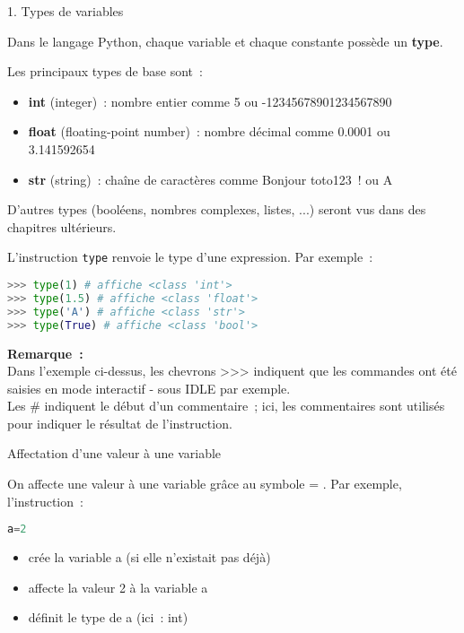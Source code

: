 
\begin{h2}1. Types de variables\end{h2}
Dans le langage Python, chaque variable et chaque constante possède un \textbf{type}.
\par
Les principaux types de base sont~:
\begin{itemize}
     \item %
     \textbf{int} (integer)~: nombre entier comme 5 ou -12345678901234567890
     \item %
     \textbf{float} (floating-point number)~: nombre décimal comme 0.0001 ou 3.141592654
     \item %
     \textbf{str} (string)~: chaîne de caractères comme \og Bonjour toto123~! \fg{} ou \og A \fg{}
\end{itemize}
\par
D'autres types (booléens, nombres complexes, listes, ...) seront vus dans des chapitres ultérieurs.
\par
L'instruction \og \texttt{type} \fg{} renvoie le type d'une expression. Par exemple~:
\begin{lstlisting}[language=Python]
>>> type(1) # affiche <class 'int'>
>>> type(1.5) # affiche <class 'float'>
>>> type('A') # affiche <class 'str'>
>>> type(True) # affiche <class 'bool'>
\end{lstlisting}
\textbf{Remarque~:}\\
Dans l'exemple ci-dessus, les chevrons >>> indiquent que les commandes ont été saisies en mode interactif - sous IDLE par exemple.\\
Les \# indiquent le début d'un commentaire~; ici, les commentaires sont utilisés pour indiquer le résultat de l'instruction.
\begin{h3}Affectation d'une valeur à une variable\end{h3}
On affecte une valeur à une variable grâce au symbole \og = \fg{}. Par exemple, l'instruction~:
\begin{lstlisting}[language=Python]
a=2
\end{lstlisting}
\begin{itemize}
     \item %
     crée la variable a (si elle n'existait pas déjà)
     \item %
     affecte la valeur 2 à la variable a
     \item %
     définit le type de a (ici~: int)
\end{itemize}
